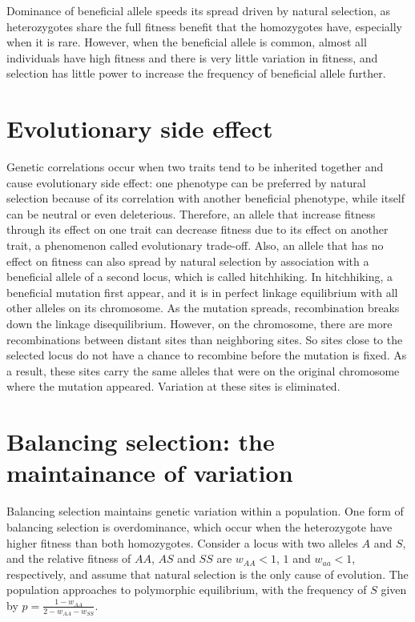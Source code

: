 \documentclass[11pt]{article}
\begin{document}
\begin{sloppypar}
\par

Dominance of beneficial allele speeds its spread driven by natural selection, as heterozygotes share the full fitness benefit that the homozygotes have, especially when it is rare. 
However, when the beneficial allele is common, almost all individuals have high fitness and there is very little variation in fitness, and selection has little power to increase the frequency of beneficial allele further. 

\section{Evolutionary side effect}
Genetic correlations occur when two traits tend to be inherited together and cause evolutionary side effect: one phenotype can be preferred by natural selection because of its correlation with another beneficial phenotype, while itself can be neutral or even deleterious. 
Therefore, an allele that increase fitness through its effect on one trait can decrease fitness due to its effect on another trait, a phenomenon called evolutionary trade-off. 
Also, an allele that has no effect on fitness can also spread by natural selection by association with a beneficial allele of a second locus, which is called hitchhiking. 
In hitchhiking, a beneficial mutation first appear, and it is in perfect linkage equilibrium with all other alleles on its chromosome. 
As the mutation spreads, recombination breaks down the linkage disequilibrium. 
However, on the chromosome, there are more recombinations between distant sites than neighboring sites. 
So sites close to the selected locus do not have a chance to recombine before the mutation is fixed. 
As a result, these sites carry the same alleles that were on the original chromosome where the mutation appeared. 
Variation at these sites is eliminated. 

\section{Balancing selection: the maintainance of variation}
Balancing selection maintains genetic variation within a population. 
One form of balancing selection is overdominance, which occur when the heterozygote have higher fitness than both homozygotes. 
Consider a locus with two alleles $A$ and $S$, and the relative fitness of $AA$, $AS$ and $SS$ are $w_{AA}<1$, $1$ and $w_{aa}<1$, respectively, and assume that natural selection is the only cause of evolution. 
The population approaches to polymorphic equilibrium, with the frequency of $S$ given by $p=\frac{1-w_{AA}}{2-w_{AA}-w_{SS}}$. 


\end{sloppypar}
\end{document}
